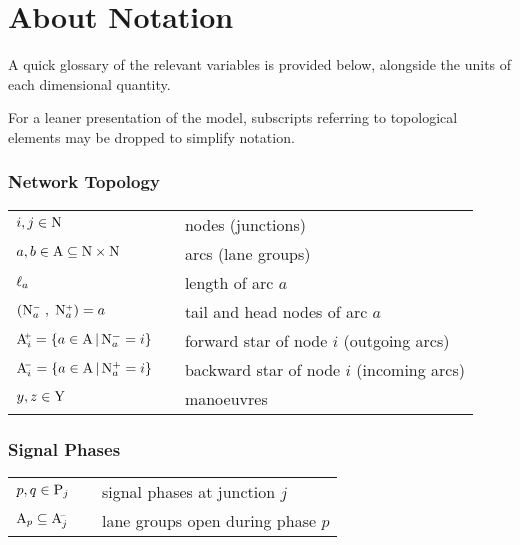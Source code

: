 \pagebreak
\section*{About Notation}
A quick glossary of the relevant variables is provided below, alongside the units of each dimensional quantity.

For a leaner presentation of the model, subscripts referring to
topological elements may be dropped to simplify notation.

\subsubsection*{Network Topology}
\begin{tabu} to \textwidth {X[3,c] X[1,c] X[6,l]}
$i,j \in \mathrm{N}$ & & nodes (junctions) \\[2pt]

$a,b \in \mathrm{A} \subseteq \mathrm{N} \times \mathrm{N} $ & & arcs (lane groups) \\[2pt]

$\ell_a$ &  & length of arc $a$ \\[2pt]

$\left( \mathrm{N}_{a}^{\scriptscriptstyle{-}} \; , \;\mathrm{N}_{a}^{\scriptscriptstyle{+}} \right) = a$ & & tail and head nodes of arc $a$ \\[2pt]

$\mathrm{A}_{i}^{\scriptscriptstyle{\hspace{-2pt}+}} = \left\lbrace a \in \mathrm{A} \, | \, \mathrm{N}_{a}^{-} = i \right\rbrace $ & & forward star of node $i$ (outgoing arcs)\\[2pt]

$\mathrm{A}_{i}^{\scriptscriptstyle{\hspace{-2pt}-}} = \left\lbrace a \in \mathrm{A} \, | \, \mathrm{N}_{a}^{+} = i \right\rbrace $ & & backward star of node $i$ (incoming arcs)\\[2pt]

$y,z \in \mathrm{Y}$ & & manoeuvres\\

\end{tabu} 


\subsubsection*{Signal Phases}
\begin{tabu} to \textwidth {X[3,c] X[1,c] X[6,l]}
$p,q \in \mathrm{P}_{j}$ & & signal phases at junction $j$\\[2pt]

$\mathrm{A}_{p} \subseteq \mathrm{A}_{j}^{\scriptscriptstyle{\hspace{-2pt}-}} $ & & lane groups open during phase $p$ \\[2pt]

\end{tabu} 


